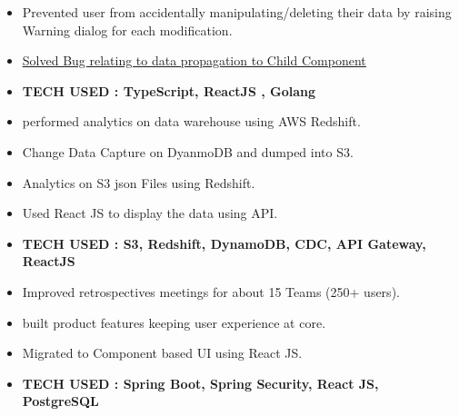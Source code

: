\documentclass[10pt,a4paper,ragged2e,withhyper]{altacv}
\begin{document}
\begin{paracol}{2}





\begin{itemize}
\item Prevented user from accidentally manipulating/deleting their data by raising Warning dialog for each modification. 
\item  \underline{\href{https://github.com/mattermost/focalboard/pull/547}{Solved Bug relating to data propagation to Child Component} }
\item \color{emphasis}\textbf{TECH USED : TypeScript, ReactJS , Golang}
\end{itemize}

\divider

\begin{itemize}
    \item performed analytics on data warehouse using AWS Redshift.
    \item Change Data Capture on DyanmoDB and dumped into S3. 
    \item Analytics on S3 json Files using Redshift.
    \item Used React JS to display the data using API.
    \item \color{emphasis}\textbf{TECH USED : S3, Redshift, DynamoDB, CDC, API Gateway, ReactJS }
\end{itemize}

\divider

\begin{itemize}
\item Improved retrospectives meetings for about 15 Teams (250+ users).
\item built product features keeping user experience at core.
\item Migrated to Component based UI using React JS.
\item \color{emphasis}\textbf{TECH USED : Spring Boot, Spring Security, React JS, PostgreSQL}
\end{itemize}



\end{paracol}
\end{document}
